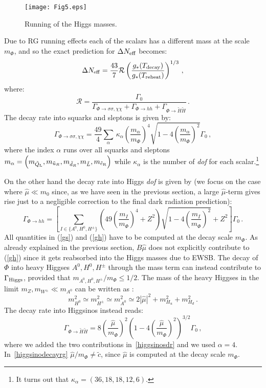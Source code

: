\documentclass[11pt,a4paper]{article}
\newcommand{\be}{\begin{equation}}
\newcommand{\ee}{\end{equation}}
\newcommand{\mc}{\mathcal}
\begin{document}
\begin{figure}[!ht]
\begin{center}
\texttt{[image: Fig5.eps]}
\caption{Running of the Higgs masses.}\label{hr}
\end{center}
\end{figure}

Due to RG running effects each of the scalars has a different mass at the scale $m_\Phi$, and so the exact prediction for $\Delta N_{\rm eff}$ becomes:
\be
\Delta N_{\rm eff} = \frac{43}{7} \mathcal{R} \left(\frac{g_* (T_{\rm decay})}{g_*(T_{\rm reheat})}\right)^{1/3} \,,
\ee
where:
\be
\mc{R} = \frac{\Gamma_0}{\Gamma_{\Phi \rightarrow \sigma\sigma,\chi\chi} + \Gamma_{\Phi \rightarrow hh} + \Gamma_{\Phi \rightarrow \tilde{H} \tilde{H}}}\,.
\ee
The decay rate into squarks and sleptons is given by:
\be
\label{gs}
\Gamma_{\Phi \rightarrow \sigma\sigma,\chi\chi} = \frac{49}{4} \sum_\alpha \, \kappa_\alpha \left(\frac{m_\alpha}{m_\Phi}\right)^4 \sqrt{1 - 4 \left(\frac{m_\alpha}{m_\Phi}\right)^2}\Gamma_0\,,
\ee
where the index $\alpha$ runs over all squarks and sleptons $m_\alpha = \left( m_{\tilde{Q}_{\rm L}}, m_{\tilde{u}_R}, m_{\tilde{d}_R}, m_{\tilde{L}}, m_{\tilde{e}_{\rm R}}\right)$ while $\kappa_\alpha$ is the number of \textit{dof} for each scalar.\footnote{It turns out that $\kappa_\alpha = \left(36, 18, 18, 12, 6\right)$.}

On the other hand the decay rate into Higgs \textit{dof} is given by (we focus on the case where $\hat\mu\ll m_0$ since, as we have seen in the previous section, a large $\hat\mu$-term gives rise just to a negligible correction to the final dark radiation prediction):
\be
\label{gh}
\Gamma_{\Phi \rightarrow hh} = \left[\sum_{I \in \{A^0, H^0, H^\pm\}} \left(49 \left(\frac{m_{I}}{m_{\Phi}} \right)^4 + Z^2 \right) \sqrt{1 - 4 \left(\frac{m_{I}}{m_{\Phi}}\right)^2} + Z^2\right]\Gamma_0\, .
\ee
All quantities in (\ref{gs}) and (\ref{gh}) have to be computed at the decay scale $m_\Phi$. As already explained in the previous section, $B\hat\mu$ does not explicitly contribute to (\ref{gh}) since it gets reabsorbed into the Higgs masses due to EWSB. The decay of $\Phi$ into heavy Higgses $A^0, H^0, H^\pm$ through the mass term can instead contribute to $\Gamma_{\rm Higgs}$, provided that $m_{A^0, H^0, H^\pm}/m_\Phi \leq 1/2$. The mass of the heavy Higgses in the limit $m_Z, m_{W^\pm} \ll m_{A^0}$ can be written as \cite{Martin:1997ns}:
\be
m_{H^0}^2 \simeq m_{H^\pm}^2 \simeq m_{A^0}^2 \simeq 2 |\hat\mu|^2 + m_{H_u}^2 + m_{H_d}^2 \,.
\ee
The decay rate into Higgsinos instead reads:
\be
\Gamma_{\Phi \rightarrow \tilde{H} \tilde{H}} = 8 \left(\frac{\hat\mu}{m_\Phi}\right)^2 \left(1 - 4 \left(\frac{\hat\mu}{m_\Phi}\right)^2\right)^{3/2} \Gamma_0 \,,
\label{higgsinodecayrg}
\ee
where we added the two contributions in~\eqref{higgsinosdr} and we used $\alpha = 4$. In~\eqref{higgsinodecayrg} $\hat\mu/m_\Phi \neq \tilde{c}$, since $\hat\mu$ is computed at the decay scale $m_\Phi$.
\end{document}

